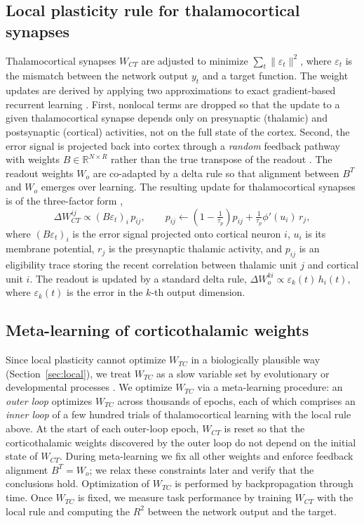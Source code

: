 \documentclass[11pt]{article}
\begin{document}
\subsection{Local plasticity rule for thalamocortical synapses}

Thalamocortical synapses $W_{CT}$ are adjusted to minimize
$\sum_t \|\varepsilon_t\|^2$, where $\varepsilon_t$ is the mismatch
between the network output $y_t$ and a target function. The weight
updates are derived by applying two approximations to exact
gradient-based recurrent learning \cite{williams1989learning}. First,
nonlocal terms are dropped so that the update to a given
thalamocortical synapse depends only on presynaptic (thalamic) and
postsynaptic (cortical) activities, not on the full state of the
cortex. Second, the error signal is projected back into cortex through
a \emph{random} feedback pathway with weights $B \in \mathbb{R}^{N
\times R}$ rather than the true transpose of the readout
\cite{lillicrap2016random}. The readout weights $W_o$ are co-adapted
by a delta rule so that alignment between $B^T$ and $W_o$ emerges over
learning. The resulting update for thalamocortical synapses is of the
three-factor form \cite{murray2019local, gerstner2018eligibility},
\begin{equation}
\Delta W_{CT}^{ij} \propto \left(B \varepsilon_t\right)_i \, p_{ij},
\qquad
p_{ij} \leftarrow \left(1 - \tfrac{1}{\tau_p}\right) p_{ij} + \tfrac{1}{\tau_p} \phi'(u_i) \, r_j,
\end{equation}
where $(B \varepsilon_t)_i$ is the error signal projected onto cortical
neuron $i$, $u_i$ is its membrane potential, $r_j$ is the presynaptic
thalamic activity, and $p_{ij}$ is an eligibility trace storing the
recent correlation between thalamic unit $j$ and cortical unit $i$.
The readout is updated by a standard delta rule,
$\Delta W_o^{ki} \propto \varepsilon_k(t)\, h_i(t)$, where
$\varepsilon_k(t)$ is the error in the $k$-th output dimension.

\subsection{Meta-learning of corticothalamic weights}

Since local plasticity cannot optimize $W_{TC}$ in a biologically
plausible way (Section~\ref{sec:local}), we treat $W_{TC}$ as a slow
variable set by evolutionary or developmental processes
\cite{wang2018prefrontal, hospedales2022meta}. We optimize $W_{TC}$ via
a meta-learning procedure: an \emph{outer loop} optimizes $W_{TC}$
across thousands of epochs, each of which comprises an \emph{inner
loop} of a few hundred trials of thalamocortical learning with the
local rule above. At the start of each outer-loop epoch, $W_{CT}$ is
reset so that the corticothalamic weights discovered by the outer loop
do not depend on the initial state of $W_{CT}$. During meta-learning we
fix all other weights and enforce feedback alignment $B^T = W_o$; we
relax these constraints later and verify that the conclusions hold.
Optimization of $W_{TC}$ is performed by backpropagation through time.
Once $W_{TC}$ is fixed, we measure task performance by training
$W_{CT}$ with the local rule and computing the $R^2$ between the
network output and the target.
\end{document}
